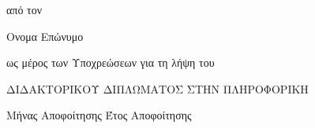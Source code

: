\documentclass{mythesis}
\renewcommand{\listfigurename}{List of Figures}
\renewcommand{\listtablename}{List of Tables}
\theoremstyle{plain}   %
\theoremstyle{plain}   %
\theoremstyle{plain}   %
\theoremstyle{plain}   %
\theoremstyle{definition}  %
\theoremstyle{definition}  %
\theoremstyle{plain}  %
\begin{document}
\begin{titlepage}
\begin{center}
\vspace{0.5in} {\Large από τον }

\vspace{0.7in} {\LARGE Ονομα Επώνυμο}

\vspace{0.5in} {\Large ως μέρος των Υποχρεώσεων για τη λήψη του}

\vspace{0.7in} {\Large ΔΙΔΑΚΤΟΡΙΚΟΥ ΔΙΠΛΩΜΑΤΟΣ ΣΤΗΝ ΠΛΗΡΟΦΟΡΙΚΗ}

\par
\vspace{2.2in} {\Large Μήνας Αποφοίτησης Έτος Αποφοίτησης}
\par\vspace{0.6in}
\end{center}
\thispagestyle{empty}
\end{titlepage}









\tableofcontents

\listoffigures


\listoftables


















\printindex




\end{document}
